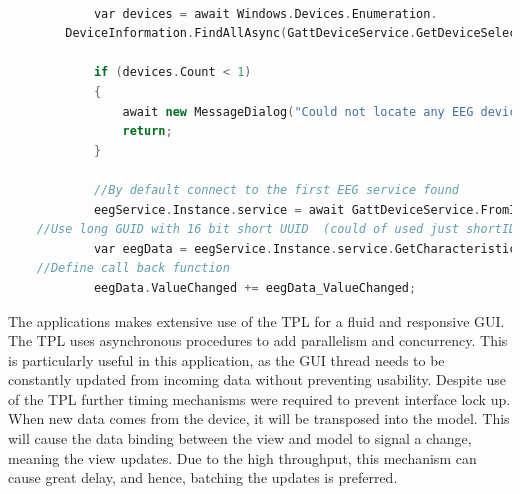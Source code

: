 \documentclass[]{article}
\begin{document}
\begin{lstlisting}[language=C++, caption=Connecting to a \ac{BLE} device's \ac{EEG} service ,label={lst:csharpeble}]

            var devices = await Windows.Devices.Enumeration.
		DeviceInformation.FindAllAsync(GattDeviceService.GetDeviceSelectorFromShortId(0xEEE0));

            if (devices.Count < 1)
            {
                await new MessageDialog("Could not locate any EEG devices in the vinicity").ShowAsync();
                return;
            }

            //By default connect to the first EEG service found
            eegService.Instance.service = await GattDeviceService.FromIdAsync(devices[0].Id);
	//Use long GUID with 16 bit short UUID  (could of used just shortID) 
            var eegData = eegService.Instance.service.GetCharacteristics(new Guid("0000EEE1-0000-1000-8000-00805f9b34fb"))[0];
	//Define call back function
            eegData.ValueChanged += eegData_ValueChanged;

\end{lstlisting}

The applications makes extensive use of the \ac{TPL} for a fluid and responsive \ac{GUI}. The \ac{TPL} uses asynchronous procedures to add parallelism and concurrency. This is particularly useful in this application, as the \ac{GUI} thread needs to be constantly updated from incoming data without preventing usability. Despite use of the \ac{TPL} further timing mechanisms were required to prevent interface lock up. When new data comes from the device, it will be transposed into the model. This will cause the data binding between the view and model to signal a change, meaning the view updates. Due to the high throughput, this mechanism can cause great delay, and hence, batching the updates is preferred.
\end{document}
